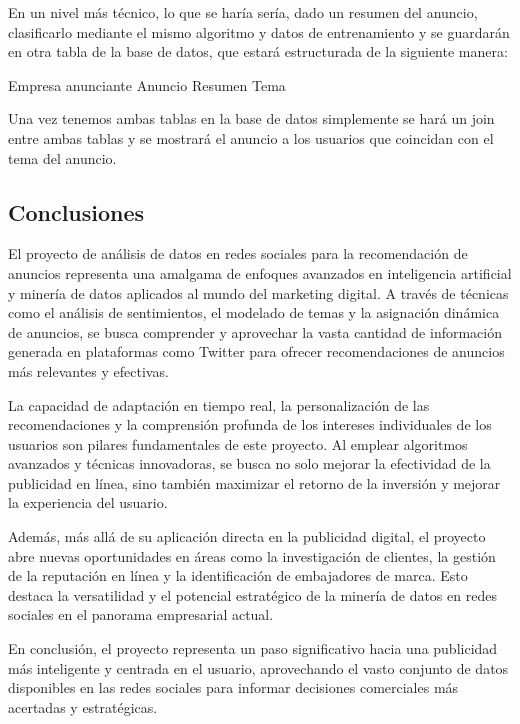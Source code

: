 \documentclass[
  letterpaper,
  DIV=11,
  numbers=noendperiod]{scrartcl}
\begin{document}
En un nivel más técnico, lo que se haría sería, dado un resumen del
anuncio, clasificarlo mediante el mismo algoritmo y datos de
entrenamiento y se guardarán en otra tabla de la base de datos, que
estará estructurada de la siguiente manera:

Empresa anunciante \textbar{} Anuncio \textbar{} Resumen \textbar{} Tema
\textbar{}

Una vez tenemos ambas tablas en la base de datos simplemente se hará un
join entre ambas tablas y se mostrará el anuncio a los usuarios que
coincidan con el tema del anuncio.

\subsection{Conclusiones}\label{conclusiones}

El proyecto de análisis de datos en redes sociales para la recomendación
de anuncios representa una amalgama de enfoques avanzados en
inteligencia artificial y minería de datos aplicados al mundo del
marketing digital. A través de técnicas como el análisis de
sentimientos, el modelado de temas y la asignación dinámica de anuncios,
se busca comprender y aprovechar la vasta cantidad de información
generada en plataformas como Twitter para ofrecer recomendaciones de
anuncios más relevantes y efectivas.

La capacidad de adaptación en tiempo real, la personalización de las
recomendaciones y la comprensión profunda de los intereses individuales
de los usuarios son pilares fundamentales de este proyecto. Al emplear
algoritmos avanzados y técnicas innovadoras, se busca no solo mejorar la
efectividad de la publicidad en línea, sino también maximizar el retorno
de la inversión y mejorar la experiencia del usuario.

Además, más allá de su aplicación directa en la publicidad digital, el
proyecto abre nuevas oportunidades en áreas como la investigación de
clientes, la gestión de la reputación en línea y la identificación de
embajadores de marca. Esto destaca la versatilidad y el potencial
estratégico de la minería de datos en redes sociales en el panorama
empresarial actual.

En conclusión, el proyecto representa un paso significativo hacia una
publicidad más inteligente y centrada en el usuario, aprovechando el
vasto conjunto de datos disponibles en las redes sociales para informar
decisiones comerciales más acertadas y estratégicas.

\newpage{}
\end{document}

